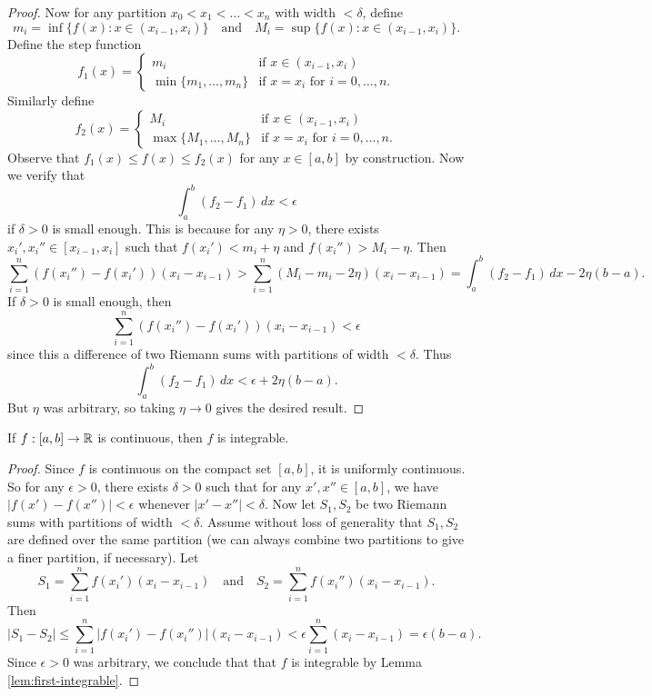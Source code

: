 \begin{proof}
  Now for any partition $x_0 < x_1 < \dots < x_n$
  with width $< \delta$, define
  \[
    m_i = \inf \{f(x) : x \in (x_{i - 1}, x_i)\}
    \quad \text{and} \quad
    M_i = \sup \{f(x) : x \in (x_{i - 1}, x_i)\}.
  \]
  Define the step function
  \[
    f_1(x) =
    \begin{cases}
      m_i & \text{if } x \in (x_{i - 1}, x_i) \\
      \min\{m_1, \dots, m_n\} & \text{if } x = x_i \text{ for } i = 0, \dots, n.
    \end{cases}
  \]
  Similarly define
  \[
    f_2(x) =
    \begin{cases}
      M_i & \text{if } x \in (x_{i - 1}, x_i) \\
      \max\{M_1, \dots, M_n\} & \text{if } x = x_i \text{ for } i = 0, \dots, n.
    \end{cases}
  \]
  Observe that $f_1(x) \le f(x) \le f_2(x)$ for
  any $x \in [a, b]$ by construction. Now we verify
  that
  \[
    \int_a^b (f_2 - f_1)\, dx < \epsilon
  \]
  if $\delta > 0$ is small enough. This is because
  for any $\eta > 0$, there exists $x_i', x_i'' \in [x_{i - 1}, x_i]$
  such that $f(x_i') < m_i + \eta$ and
  $f(x_i'') > M_i - \eta$. Then
  \[
    \sum_{i = 1}^n (f(x_i'') - f(x_i'))(x_i - x_{i - 1})
    > \sum_{i = 1}^n (M_i - m_i - 2\eta)(x_i - x_{i - 1})
    = \int_a^b (f_2 - f_1)\, dx - 2\eta(b - a).
  \]
  If $\delta > 0$ is small enough, then
  \[
    \sum_{i = 1}^n (f(x_i'') - f(x_i'))(x_i - x_{i - 1})
    < \epsilon
  \]
  since this a difference of two Riemann sums with
  partitions of width $< \delta$. Thus
  \[
    \int_a^b (f_2 - f_1)\, dx < \epsilon + 2\eta(b - a).
  \]
  But $\eta$ was arbitrary, so taking $\eta \to 0$
  gives the desired result.
\end{proof}

\begin{theorem}
  If $f : [a, b] \to \mathbb{R}$ is continuous, then $f$ is
  integrable.
\end{theorem}

\begin{proof}
  Since $f$ is continuous on the compact set $[a, b]$,
  it is uniformly continuous. So for any $\epsilon > 0$,
  there exists $\delta > 0$ such that for any
  $x', x'' \in [a, b]$, we have
  $|f(x') - f(x'')| < \epsilon$ whenever
  $|x' - x''| < \delta$. Now let $S_1, S_2$
  be two Riemann sums
  with partitions of width $< \delta$. Assume without
  loss of generality that $S_1, S_2$ are defined
  over the same partition (we can always combine two
  partitions to give a finer partition, if necessary).
  Let
  \[
    S_1 = \sum_{i = 1}^n f(x_i') (x_i - x_{i - 1})
    \quad \text{and} \quad
    S_2 = \sum_{i = 1}^n f(x_i'') (x_i - x_{i - 1}).
  \]
  Then
  \[
    |S_1 - S_2| \le \sum_{i = 1}^n |f(x_i') - f(x_i'')| (x_i - x_{i - 1})
    < \epsilon \sum_{i = 1}^n (x_i - x_{i - 1})
    = \epsilon (b - a).
  \]
  Since $\epsilon > 0$ was arbitrary, we conclude that
  that $f$ is integrable by Lemma \ref{lem:first-integrable}.
\end{proof}

